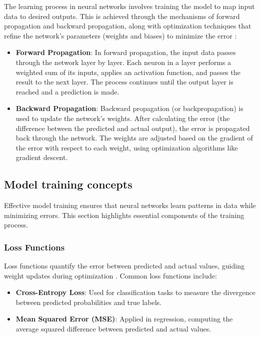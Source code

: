 The learning process in neural networks involves training the model to map input data to desired outputs. This is achieved through the mechanisms of forward propagation and backward propagation, along with optimization techniques that refine the network's parameters (weights and biases) to minimize the error \parencite{Kelleher2019}:
\begin{itemize}
    \item \textbf{Forward Propagation}: In forward propagation, the input data passes through the network layer by layer. Each neuron in a layer performs a weighted sum of its inputs, applies an activation function, and passes the result to the next layer. The process continues until the output layer is reached and a prediction is made.
    
    \item \textbf{Backward Propagation}: Backward propagation (or backpropagation) is used to update the network's weights. After calculating the error (the difference between the predicted and actual output), the error is propagated back through the network. The weights are adjusted based on the gradient of the error with respect to each weight, using optimization algorithms like gradient descent.
\end{itemize}






\subsection{Model training concepts}

Effective model training ensures that neural networks learn patterns in data while minimizing errors. This section highlights essential components of the training process.

\subsubsection{Loss Functions} 
Loss functions quantify the error between predicted and actual values, guiding weight updates during optimization \parencite{alzubaidi2021review}. Common loss functions include:
\begin{itemize}
    \item \textbf{Cross-Entropy Loss}: Used for classification tasks to measure the divergence between predicted probabilities and true labels.
    \item \textbf{Mean Squared Error (MSE)}: Applied in regression, computing the average squared difference between predicted and actual values.
\end{itemize}

